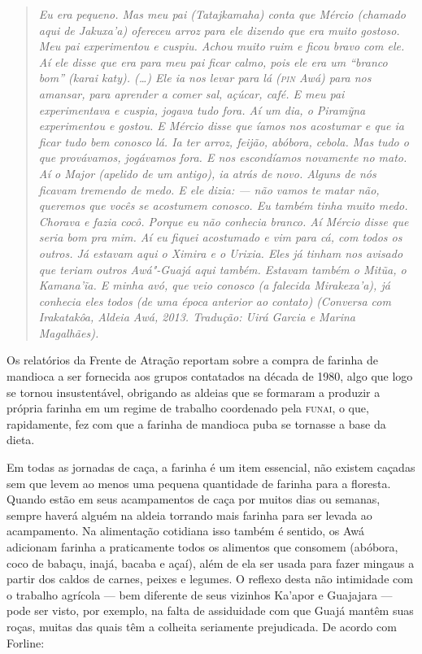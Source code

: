 \begin{quote}
\emph{Eu era pequeno. Mas meu pai (Tatajkamaha) conta que Mércio
(chamado aqui de Jakuxa'a) ofereceu arroz para ele dizendo que era muito
gostoso. Meu pai experimentou e cuspiu. Achou muito ruim e ficou bravo
com ele. Aí ele disse que era para meu pai ficar calmo, pois ele era um
``branco bom'' (karai katy). (\ldots{}) Ele ia nos levar para lá (\textsc{pin} Awá)
para nos amansar, para aprender a comer sal, açúcar, café. E meu pai
experimentava e cuspia, jogava tudo fora. Aí um dia, o Piramỹna
experimentou e gostou. E Mércio disse que íamos nos acostumar e que ia
ficar tudo bem conosco lá. Ia ter arroz, feijão, abóbora, cebola. Mas
tudo o que provávamos, jogávamos fora. E nos escondíamos novamente no
mato. Aí o Major (apelido de um antigo), ia atrás de novo. Alguns de nós
ficavam tremendo de medo. E ele dizia: --- não vamos te matar não,
queremos que vocês se acostumem conosco. Eu também tinha muito medo.
Chorava e fazia cocô. Porque eu não conhecia branco. Aí Mércio disse que
seria bom pra mim. Aí eu fiquei acostumado e vim para cá, com todos os
outros. Já estavam aqui o Ximira e o Urixia. Eles já tinham nos avisado
que teriam outros Awá"-Guajá aqui também. Estavam também o Mitũa, o
Kamana'ĩa. E minha avó, que veio conosco (a falecida Mirakexa'a), já
conhecia eles todos (de uma época anterior ao contato) (Conversa com
Irakatakôa, Aldeia Awá, 2013. Tradução: Uirá Garcia e Marina Magalhães).}
\end{quote}

Os relatórios da Frente de Atração reportam sobre a compra de farinha de
mandioca a ser fornecida aos grupos contatados na década de 1980, algo
que logo se tornou insustentável, obrigando as aldeias que se formaram a
produzir a própria farinha em um regime de trabalho coordenado pela
\textsc{funai}, o que, rapidamente, fez com que a farinha de mandioca puba se
tornasse a base da dieta.

Em todas as jornadas de caça, a farinha é um item essencial, não existem
caçadas sem que levem ao menos uma pequena quantidade de farinha para a
floresta. Quando estão em seus acampamentos de caça por muitos dias ou
semanas, sempre haverá alguém na aldeia torrando mais farinha para ser
levada ao acampamento. Na alimentação cotidiana isso também é sentido,
os Awá adicionam farinha a praticamente todos os alimentos que consomem
(abóbora, coco de babaçu, inajá, bacaba e açaí), além de ela ser usada
para fazer mingaus a partir dos caldos de carnes, peixes e legumes. O
reflexo desta não intimidade com o trabalho agrícola --- bem diferente de
seus vizinhos Ka'apor e Guajajara --- pode ser visto, por exemplo, na
falta de assiduidade com que Guajá mantêm suas roças, muitas das quais
têm a colheita seriamente prejudicada. De acordo com Forline:

